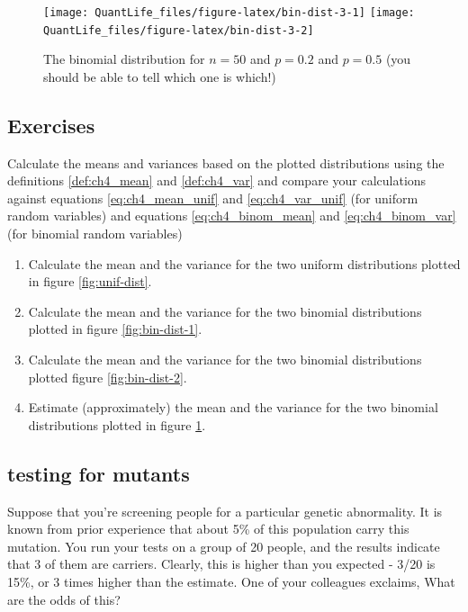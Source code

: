 \documentclass[
]{book}
\theoremstyle{definition}
\theoremstyle{definition}
\theoremstyle{definition}
\theoremstyle{remark}
\begin{document}
\begin{figure}

{\centering \texttt{[image: QuantLife\_files/figure-latex/bin-dist-3-1]} \texttt{[image: QuantLife\_files/figure-latex/bin-dist-3-2]} 

}

\caption{The binomial distribution for $n=50$ and $p=0.2$ and $p=0.5$ (you should be able to tell which one is which!)}\label{fig:bin-dist-3}
\end{figure}

\hypertarget{exercises-22}{%
\subsection{Exercises}\label{exercises-22}}

Calculate the means and variances based on the plotted distributions using the definitions \ref{def:ch4_mean} and \ref{def:ch4_var} and compare your calculations against equations \ref{eq:ch4_mean_unif} and \ref{eq:ch4_var_unif} (for uniform random variables) and equations \ref{eq:ch4_binom_mean} and \ref{eq:ch4_binom_var} (for binomial random variables)

\begin{enumerate}
\def\labelenumi{\arabic{enumi}.}
\item
  Calculate the mean and the variance for the two uniform distributions plotted in figure \ref{fig:unif-dist}.
\item
  Calculate the mean and the variance for the two binomial distributions plotted in figure \ref{fig:bin-dist-1}.
\item
  Calculate the mean and the variance for the two binomial distributions plotted figure \ref{fig:bin-dist-2}.
\item
  Estimate (approximately) the mean and the variance for the two binomial distributions plotted in figure \ref{fig:bin-dist-3}.
\end{enumerate}

\hypertarget{testing-for-mutants}{%
\subsection{testing for mutants}\label{testing-for-mutants}}

Suppose that you're screening people for a particular genetic abnormality. It is known from prior experience that about 5\% of this population carry this mutation. You run your tests on a group of 20 people, and the results indicate that 3 of them are carriers. Clearly, this is higher than you expected - 3/20 is 15\%, or 3 times higher than the estimate. One of your colleagues exclaims, What are the odds of this?
\end{document}
